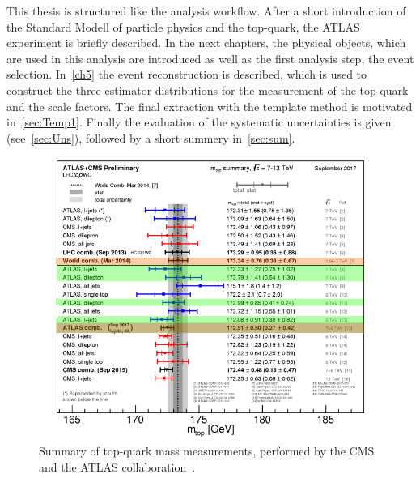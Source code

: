 This thesis is structured like the analysis workflow. After a short introduction of the Standard Modell of particle physics and the top-quark, the ATLAS experiment is briefly described. In the next chapters, the physical objects, which are used in this analysis are introduced as well as the first analysis step, the event selection. In~\cref{ch5} the event reconstruction is described, which is used to construct the three estimator distributions for the measurement of the top-quark and the scale factors. The final extraction with the template method is motivated in~\cref{sec:Temp1}. Finally the evaluation of the systematic uncertainties is given (see~\cref{sec:Uns}), followed by a short summery in~\cref{sec:sum}.




\begin{figure}[h]
	\centering
	\includegraphics[width=0.8\linewidth]{Pics/mass}
	\caption{Summary of top-quark mass measurements, performed by the CMS and the ATLAS collaboration~\cite{PubR}. }
	
	\label{fig:mass}
\end{figure}



